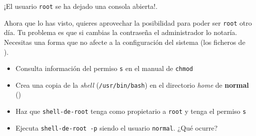 \begin{homeworkProblem}


  \begin{multicols}{2}

    \null \vfill
    \begin{Actividad}
      ¡El usuario \texttt{root} se ha dejado una consola abierta!.

      Ahora que lo has visto, quieres aprovechar la posibilidad para poder ser \texttt{root} otro día. Tu problema es que si cambias la contraseña el administrador lo notaría. Necesitas una forma que no afecte a la configuración del sistema (los ficheros de ).
    \end{Actividad}
    \vfill \null
    \columnbreak



    \begin{Actividad}
      \begin{itemize}
      \item Consulta información del permiso \texttt{s} en el manual de \texttt{chmod}
      \item Crea una copia de la \textit{shell} (\texttt{/usr/bin/bash}) en el directorio \textit{home} de \textbf{normal} ()
      \item Haz que \texttt{shell-de-root} tenga como propietario a \texttt{root} y tenga el permiso \texttt{s}
      \item Ejecuta \texttt{shell-de-root -p} siendo el usuario \texttt{normal}. ¿Qué ocurre?
      \end{itemize}
    \end{Actividad}

  \end{multicols}

  
\end{homeworkProblem}


